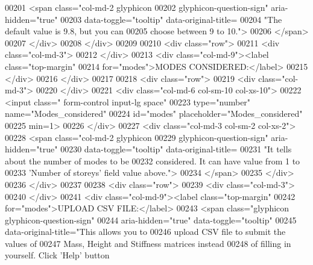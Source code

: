 \begin{DoxyCode}
00201                         <span class="col-md-2 glyphicon 
00202                             glyphicon-question-sign" aria-hidden="true"
00203                             data-toggle="tooltip" data-original-title=
00204                             "The default value is 9.8, but you can 
00205                             choose between 9 to 10.">
00206                         </span>
00207                     </div>
00208                 </div>
00209                   
00210                 <div class="row">
00211                     <div class="col-md-3">
00212                     </div>
00213                     <div class="col-md-9"><label class="top-margin"
00214                         for="modes">MODES CONSIDERED:</label>
00215                     </div>
00216                 </div>
00217                 
00218                 <div class="row">
00219                     <div class="col-md-3">
00220                     </div>
00221                     <div class="col-md-6 col-sm-10 col-xs-10">
00222                         <input class=" form-control input-lg space"
00223                         type="number" name="Modes\_considered" 
00224                         id="modes" placeholder="Modes\_considered" 
00225                         min=1>
00226                     </div>
00227                     <div class="col-md-3 col-sm-2 col-xs-2">
00228                         <span class="col-md-2 glyphicon 
00229                             glyphicon-question-sign" aria-hidden="true" 
00230                             data-toggle="tooltip" data-original-title=
00231                             "It tells about the number of modes to be 
00232                             considered. It can have value from 1 to
00233                             'Number of storeys' field value above.">
00234                         </span>
00235                     </div>
00236                 </div>
00237                     
00238                 <div class="row">
00239                     <div class="col-md-3">
00240                     </div>
00241                     <div class="col-md-9"><label class="top-margin"
00242                        for="modes">UPLOAD CSV FILE:</label>
00243                         <span class="glyphicon glyphicon-question-sign"
00244                            aria-hidden="true" data-toggle="tooltip"
00245                            data-original-title="This allows you to 
00246                             upload CSV file to submit the values of 
00247                             Mass, Height and Stiffness matrices instead
00248                             of filling in yourself. Click 'Help' button

\end{DoxyCode}
